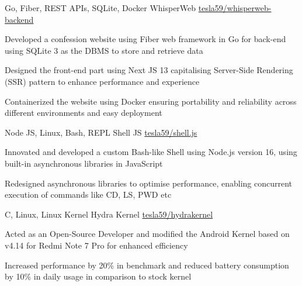 \documentclass[]{awesome-cv}
\begin{document}
\begin{cventries}
    \cventry
    {Go, Fiber, REST APIs, SQLite, Docker}
    {WhisperWeb}
    {\href{https://github.com/tesla59/whisperweb-backend}{tesla59/whisperweb-backend}}
    {}
    {\begin{cvitems}
            \item Developed a confession website using Fiber web framework in Go for back-end using SQLite 3 as the DBMS to store and retrieve data
            \item Designed the front-end part using Next JS 13 capitalising Server-Side Rendering (SSR) pattern to enhance performance and experience
            \item Containerized the website using Docker ensuring portability and reliability across different environments and easy deployment
        \end{cvitems}}

    \vspace{-5mm}
    \cventry
    {Node JS, Linux, Bash, REPL}
    {Shell JS}
    {\href{https://github.com/tesla59/shell.js}{tesla59/shell.js}}
    {}
    {\begin{cvitems}
            \item Innovated and developed a custom Bash-like Shell using Node.js version 16, using built-in asynchronous libraries in JavaScript
            \item Redesigned asynchronous libraries to optimise performance, enabling concurrent execution of commands like CD, LS, PWD etc
        \end{cvitems}}

    \vspace{-5mm}
    \cventry
    {C, Linux, Linux Kernel}
    {Hydra Kernel}
    {\href{https://github.com/tesla59/hydra_kernel}{tesla59/hydra\textunderscore{}kernel}}
    {}
    {\begin{cvitems}
            \item Acted as an Open-Source Developer and modified the Android Kernel based on v4.14 for Redmi Note 7 Pro for enhanced efficiency
            \item Increased performance by 20\% in benchmark and reduced battery consumption by 10\% in daily usage in comparison to stock kernel
        \end{cvitems}}

    \vspace{-3mm}
\end{cventries}
\end{document}
